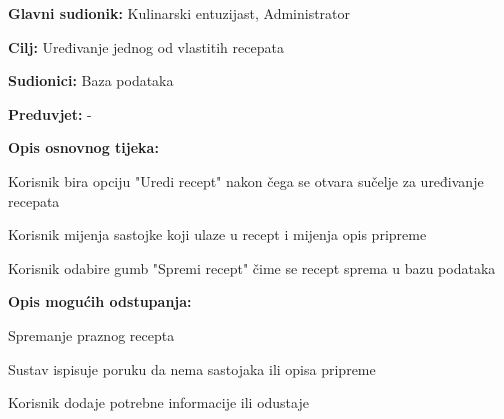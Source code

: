 					\noindent {}
					\begin{packed_item}
	
						\item \textbf{Glavni sudionik: } Kulinarski entuzijast, Administrator 
						\item  \textbf{Cilj:} Uređivanje jednog od vlastitih recepata
						\item  \textbf{Sudionici:} Baza podataka
						\item  \textbf{Preduvjet:} -
						\item  \textbf{Opis osnovnog tijeka:} 
						
						\item[] \begin{packed_enum}
	
						\item Korisnik bira opciju "Uredi recept" nakon čega se otvara sučelje za uređivanje recepata
						\item Korisnik mijenja sastojke koji ulaze u recept i mijenja opis pripreme
						\item Korisnik odabire gumb "Spremi recept" čime se recept sprema u bazu podataka
						\end{packed_enum}
						
						\item  \textbf{Opis mogućih odstupanja:}
						
						\item[] \begin{packed_item}
	
							\item[2.a] Spremanje praznog recepta
							\item[] \begin{packed_enum}
								
								\item Sustav ispisuje poruku da nema sastojaka ili opisa pripreme
								\item Korisnik dodaje potrebne informacije ili odustaje
								
							\end{packed_enum}						


						\end{packed_item}
					\end{packed_item}

